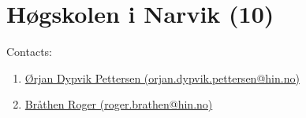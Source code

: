 


\section{Høgskolen i Narvik (10)}
\label{sec:HiN}

Contacts:\begin{enumerate}
 \item {}\href{mailto:orjan.dypvik.pettersen@hin.no}{Ørjan Dypvik Pettersen (orjan.dypvik.pettersen@hin.no)}
 \item {}\href{mailto:roger.brathen@hin.no}{Bråthen Roger (roger.brathen@hin.no)}
\end{enumerate}

